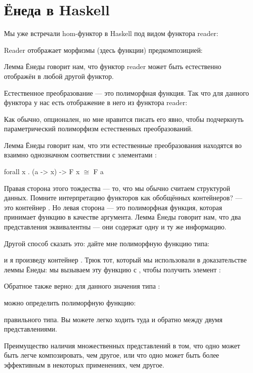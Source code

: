 \section{Ёнеда в Haskell}

Мы уже встречали hom-функтор в Haskell под видом
функтора reader:

Reader отображает морфизмы (здесь функции) предкомпозицией:

Лемма Ёнеды говорит нам, что функтор reader может быть естественно
отображён в любой другой функтор.

Естественное преобразование --- это полиморфная функция. Так что для данного функтора
 у нас есть отображение в него из функтора reader:

Как обычно,  опционален, но мне нравится писать его явно,
чтобы подчеркнуть параметрический полиморфизм естественных преобразований.

Лемма Ёнеды говорит нам, что эти естественные преобразования находятся во
взаимно однозначном соответствии с элементами :

\begin{snipv}
forall x . (a -> x) -> F x \ensuremath{\cong} F a
\end{snipv}
Правая сторона этого тождества --- то, что мы обычно считаем
структурой данных. Помните интерпретацию функторов как обобщённых
контейнеров?  --- это контейнер . Но левая
сторона --- это полиморфная функция, которая принимает функцию в качестве
аргумента. Лемма Ёнеды говорит нам, что два представления
эквивалентны --- они содержат одну и ту же информацию.

Другой способ сказать это: дайте мне полиморфную функцию типа:

и я произведу контейнер . Трюк тот, который мы использовали
в доказательстве леммы Ёнеды: мы вызываем эту функцию с ,
чтобы получить элемент :

Обратное также верно: для данного значения типа :

можно определить полиморфную функцию:

правильного типа. Вы можете легко ходить туда и обратно между двумя
представлениями.

Преимущество наличия множественных представлений в том, что одно может быть
легче композировать, чем другое, или что одно может быть более эффективным в
некоторых применениях, чем другое.

